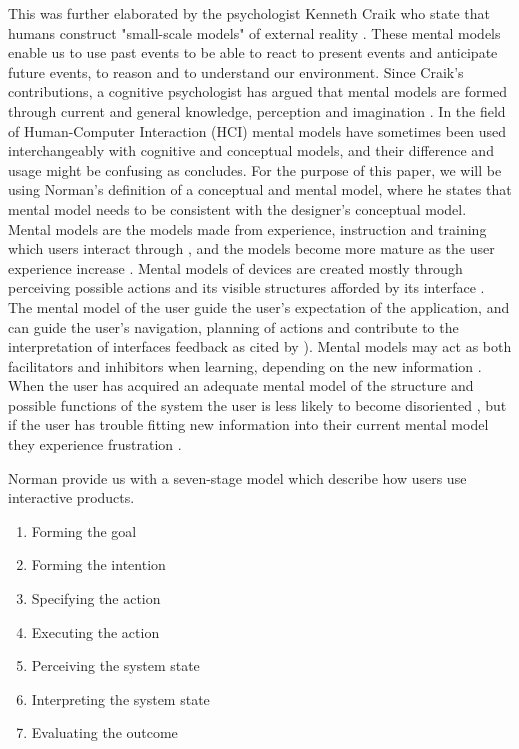 This was further elaborated by the psychologist Kenneth Craik who state that humans construct "small-scale models" of external reality \cite{Craik1967}. These mental models enable us to use past events to be able to react to present events and anticipate future events, to reason and to understand our environment. Since Craik's contributions, a cognitive psychologist has argued that mental models are formed through current and general knowledge, perception and imagination \cite{Johnson-Laird2001}. In the field of Human-Computer Interaction (HCI) mental models have sometimes been used interchangeably with cognitive and conceptual models, and their difference and usage might be confusing as \cite{Staggers1993} concludes. For the purpose of this paper, we will be using Norman's \cite{Norman2013a} definition of a conceptual and mental model, where he states that mental model needs to be consistent with the designer's conceptual model. Mental models are the models made from experience, instruction and training which users interact through \cite{Norman2013a}, and the models become more mature as the user experience increase \cite{Barker1998}. Mental models of devices are created mostly through perceiving possible actions and its visible structures afforded by its interface \cite{Norman2013a}. The mental model of the user guide the user's expectation of the application, and can guide the user's navigation, planning of actions and contribute to the interpretation of interfaces feedback as cited by \cite{Jih1992}). Mental models may act as both facilitators and inhibitors when learning, depending on the new information \cite{Cho1996}. When the user has acquired an adequate mental model of the structure and possible functions of the system the user is less likely to become disoriented \cite{Jih1992}, but if the user has trouble fitting new information into their current mental model they experience frustration \cite{DApollonia2004}.

Norman \cite{Norman2013a} provide us with a seven-stage model which describe how users use interactive products.
\begin{enumerate}
  \item Forming the goal
  \item Forming the intention
  \item Specifying the action
  \item Executing the action
  \item Perceiving the system state
  \item Interpreting the system state
  \item Evaluating the outcome
\end{enumerate}

